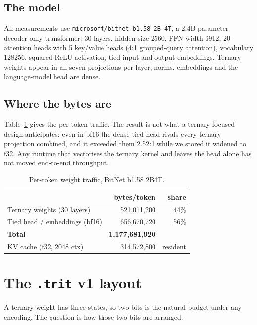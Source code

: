 \documentclass[10pt,twocolumn]{article}
\begin{document}
\subsection{The model}

All measurements use \texttt{microsoft/bitnet-b1.58-2B-4T}, a 2.4B-parameter
decoder-only transformer: 30 layers, hidden size 2560, FFN width 6912, 20
attention heads with 5 key/value heads (4:1 grouped-query attention), vocabulary
128256, squared-ReLU activation, tied input and output embeddings. Ternary
weights appear in all seven projections per layer; norms, embeddings and the
language-model head are dense.

\subsection{Where the bytes are}

Table~\ref{tab:bytes} gives the per-token traffic. The result is not what a
ternary-focused design anticipates: even in bf16 the dense tied head rivals
every ternary projection combined, and it exceeded them 2.52:1 while we stored
it widened to f32. Any runtime that vectorises the ternary kernel and leaves the
head alone has not moved end-to-end throughput.

\begin{table}[t]
\centering
\small
\begin{tabular}{lrr}
\toprule
 & bytes/token & share \\
\midrule
Ternary weights (30 layers)     & 521{,}011{,}200   & 44\% \\
Tied head / embeddings (bf16)   & 656{,}670{,}720   & 56\% \\
\midrule
\textbf{Total}                  & \textbf{1{,}177{,}681{,}920} & \\
\midrule
KV cache (f32, 2048 ctx)        & 314{,}572{,}800   & resident \\
\bottomrule
\end{tabular}
\caption{Per-token weight traffic, BitNet b1.58 2B4T.}
\label{tab:bytes}
\end{table}

\section{The \texttt{.trit} v1 layout}
\label{sec:format}

A ternary weight has three states, so two bits is the natural budget under any
encoding. The question is how those two bits are arranged.
\end{document}
